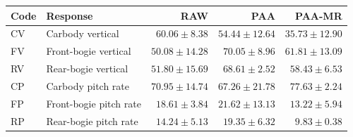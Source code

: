 \begin{tabular}{llrrr}
\toprule
Code & Response & RAW & PAA & PAA-MR \\
\midrule
CV & Carbody vertical & $60.06 \pm 8.38$ & $54.44 \pm 12.64$ & $35.73 \pm 12.90$ \\
FV & Front-bogie vertical & $50.08 \pm 14.28$ & $70.05 \pm 8.96$ & $61.81 \pm 13.09$ \\
RV & Rear-bogie vertical & $51.80 \pm 15.69$ & $68.61 \pm 2.52$ & $58.43 \pm 6.53$ \\
CP & Carbody pitch rate & $70.95 \pm 14.74$ & $67.26 \pm 21.78$ & $77.63 \pm 2.24$ \\
FP & Front-bogie pitch rate & $18.61 \pm 3.84$ & $21.62 \pm 13.13$ & $13.22 \pm 5.94$ \\
RP & Rear-bogie pitch rate & $14.24 \pm 5.13$ & $19.35 \pm 6.32$ & $9.83 \pm 0.38$ \\
\bottomrule
\end{tabular}
